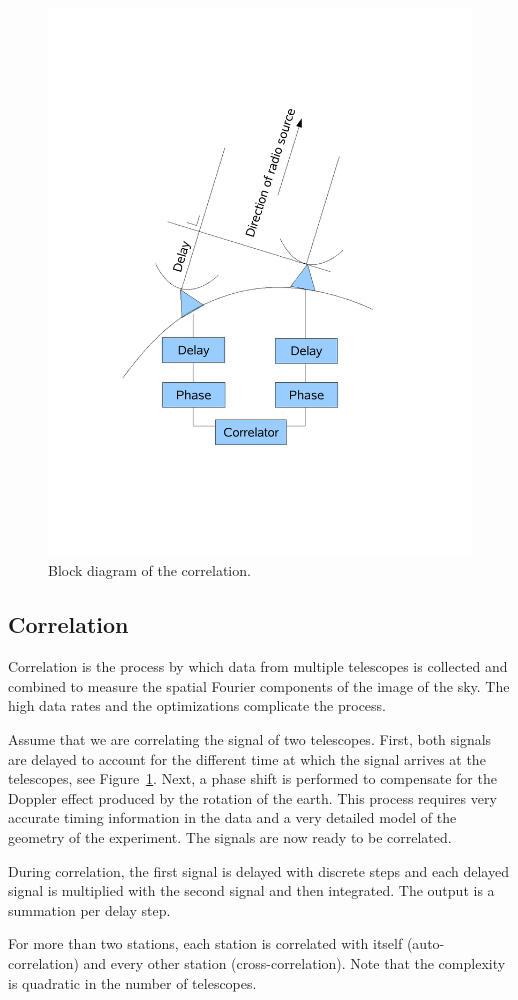 \begin{figure}
  \centering
  \includegraphics[width=.425\textwidth]
    {img/VLBI}
    \caption{Block diagram of the correlation.}
  \label{fig:correlation_diagram}
\end{figure}
\subsection{Correlation}
Correlation is the process by which data from multiple telescopes is
collected and combined to measure the spatial Fourier components of
the image of the sky. The high data rates and the optimizations
complicate the process.

Assume that we are correlating the signal of two telescopes. First,
both signals are delayed to account for the different time at which
the signal arrives at the telescopes, see
Figure~\ref{fig:correlation_diagram}. Next, a phase shift is performed
to compensate for the Doppler effect produced by the rotation of the
earth. This process requires very accurate timing information in the
data and a very detailed model of the geometry of the experiment. The
signals are now ready to be correlated.

During correlation, the first signal is delayed with discrete steps
and each delayed signal is multiplied with the second signal and then
integrated.  The output is a summation per delay step.

For more than two stations, each station is correlated with itself
(auto-correlation) and every other station (cross-correlation). Note
that the complexity is quadratic in the number of telescopes.

